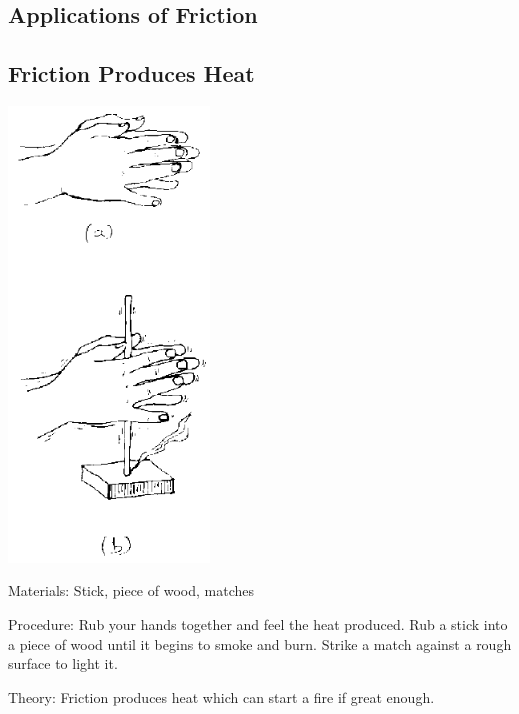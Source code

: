 \begin{multicols}{2}

\section*{Applications of Friction}


\subsection{Friction Produces Heat}

\begin{center}
\includegraphics[width=0.4\textwidth]{./img/source/friction-heat.png}
\end{center}

\begin{description*}
\item[Materials:]{Stick, piece of wood, matches}
\item[Procedure:]{Rub your hands together and feel the heat produced. Rub a stick into a piece of wood until it begins to smoke and burn. Strike a match against a rough surface to light it.}
\item[Theory:]{Friction produces heat which can start a fire if great enough.}
\end{description*}


\end{multicols}
